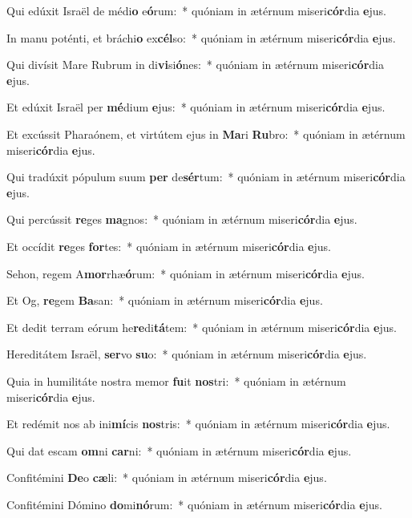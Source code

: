 \item Qui edúxit Israël de médi\textbf{o} e\textbf{ó}rum:~* quóniam in ætérnum miseri\textbf{cór}dia \textbf{e}jus.
\item In manu poténti, et bráchi\textbf{o} ex\textbf{cél}so:~* quóniam in ætérnum miseri\textbf{cór}dia \textbf{e}jus.
\item Qui divísit Mare Rubrum in di\textbf{vi}si\textbf{ó}nes:~* quóniam in ætérnum miseri\textbf{cór}dia \textbf{e}jus.
\item Et edúxit Israël per \textbf{mé}dium \textbf{e}jus:~* quóniam in ætérnum miseri\textbf{cór}dia \textbf{e}jus.
\item Et excússit Pharaónem, et virtútem ejus in \textbf{Ma}ri \textbf{Ru}bro:~* quóniam in ætérnum miseri\textbf{cór}dia \textbf{e}jus.
\item Qui tradúxit pópulum suum \textbf{per} de\textbf{sér}tum:~* quóniam in ætérnum miseri\textbf{cór}dia \textbf{e}jus.
\item Qui percússit \textbf{re}ges \textbf{ma}gnos:~* quóniam in ætérnum miseri\textbf{cór}dia \textbf{e}jus.
\item Et occídit \textbf{re}ges \textbf{for}tes:~* quóniam in ætérnum miseri\textbf{cór}dia \textbf{e}jus.
\item Sehon, regem A\textbf{mor}rhæ\textbf{ó}rum:~* quóniam in ætérnum miseri\textbf{cór}dia \textbf{e}jus.
\item Et Og, \textbf{re}gem \textbf{Ba}san:~* quóniam in ætérnum miseri\textbf{cór}dia \textbf{e}jus.
\item Et dedit terram eórum he\textbf{re}di\textbf{tá}tem:~* quóniam in ætérnum miseri\textbf{cór}dia \textbf{e}jus.
\item Hereditátem Israël, \textbf{ser}vo \textbf{su}o:~* quóniam in ætérnum miseri\textbf{cór}dia \textbf{e}jus.
\item Quia in humilitáte nostra memor \textbf{fu}it \textbf{nos}tri:~* quóniam in ætérnum miseri\textbf{cór}dia \textbf{e}jus.
\item Et redémit nos ab ini\textbf{mí}cis \textbf{nos}tris:~* quóniam in ætérnum miseri\textbf{cór}dia \textbf{e}jus.
\item Qui dat escam \textbf{om}ni \textbf{car}ni:~* quóniam in ætérnum miseri\textbf{cór}dia \textbf{e}jus.
\item Confitémini \textbf{De}o \textbf{cæ}li:~* quóniam in ætérnum miseri\textbf{cór}dia \textbf{e}jus.
\item Confitémini Dómino \textbf{do}mi\textbf{nó}rum:~* quóniam in ætérnum miseri\textbf{cór}dia \textbf{e}jus.
